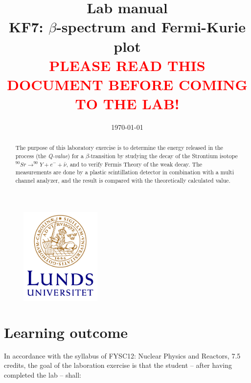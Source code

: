 \documentclass[a4,11pt, notitlepage]{article}
\begin{document}
 
 

\title{\huge{Lab manual
\\KF7: $\beta$-spectrum and Fermi-Kurie plot
\vspace{1cm}
\\\textcolor{red}{PLEASE READ THIS DOCUMENT BEFORE COMING TO THE LAB!}}}
\date{\today}
\maketitle

\vspace{10pt}
\begin{abstract}
The purpose of this laboratory exercise is to determine the energy released in the process (the \textit{Q-value}) for a $\beta$-transition by studying the decay of the Strontium isotope 
\\$^{90}Sr\rightarrow ^{90}Y + e^- + \bar{\nu}$, and to verify Fermis Theory of
the weak decay.
The measurements are done by a plastic scintillation detector in combination with a multi channel analyzer, and the result is compared with the theoretically calculated value. 
\end{abstract}

\begin{figure}[htp]
  \vspace{30pt}
  \begin{center}
    \includegraphics[width=4.0cm]{figures/Lunds_universitet_C2r_RGB}
  \end{center}
\end{figure}

\thispagestyle{empty}

\pagebreak
\tableofcontents 
\pagebreak
\section{Learning outcome}

In accordance with the syllabus of FYSC12: Nuclear Physics and Reactors, 7.5
credits, the goal of the laboration exercise is that the student -- after
having completed the lab -- shall:
\end{document}

